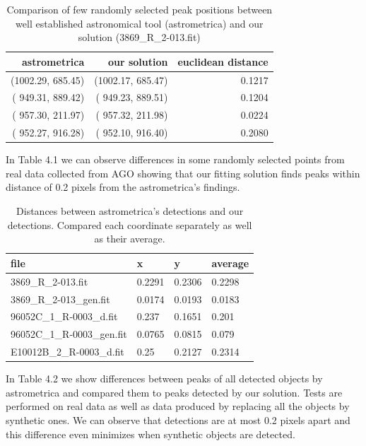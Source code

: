\documentclass[12pt, a4paper, oneside]{book}
\begin{document}
\begin{table}[H]
    \centering
\begin{tabular}{|r|r|r|}
\hline
    astrometrica & our solution & euclidean distance\\ \hline
    (1002.29, 685.45) &  (1002.17, 685.47) & 0.1217\\ \hline
    ( 949.31, 889.42) &  ( 949.23, 889.51) & 0.1204\\ \hline
    ( 957.30, 211.97) &  ( 957.32, 211.98) & 0.0224\\ \hline
    ( 952.27, 916.28) &  ( 952.10, 916.40) & 0.2080\\ \hline
\end{tabular}
    \caption{Comparison of few randomly selected peak positions between well established astronomical tool (astrometrica) and our solution (3869\_R\_2-013.fit)}
    \label{tab:compare_peaks}
\end{table}

In Table 4.1 we can observe differences in some randomly selected points from real data collected from AGO showing that our fitting solution finds peaks within distance of 0.2 pixels from the astrometrica's findings.


\begin{table}[H]
    \centering
\begin{tabular}{|l|l|l|l|}
\hline
    file & x & y & average \\ \hline
    3869\_R\_2-013.fit & 0.2291 & 0.2306 & 0.2298 \\ \hline
    3869\_R\_2-013\_gen.fit & 0.0174 & 0.0193 & 0.0183 \\ \hline
    96052C\_1\_R-0003\_d.fit & 0.237 & 0.1651 & 0.201 \\ \hline
    96052C\_1\_R-0003\_gen.fit & 0.0765 & 0.0815 & 0.079 \\ \hline
    E10012B\_2\_R-0003\_d.fit & 0.25 & 0.2127 & 0.2314 \\ \hline
\end{tabular}
    \caption{Distances between astrometrica's detections and our detections. Compared each coordinate separately as well as their average.}
    \label{tab:compare_peaks}
\end{table}

In Table 4.2 we show differences between peaks of all detected objects by astrometrica and compared them to peaks detected by our solution.
Tests are performed on real data as well as data produced by replacing all the objects by synthetic ones.
We can observe that detections are at most 0.2 pixels apart and this difference even minimizes when synthetic objects are detected.
\end{document}
